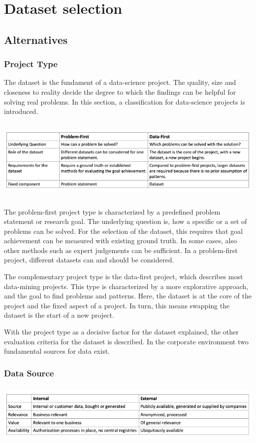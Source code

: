 \chapter{Dataset selection}

\section{Alternatives}

	\subsection{Project Type}
	The dataset is the fundament of a data-science project. The quality, size and closeness to reality decide the degree to which the findings can be helpful for solving real problems. 
	In this section, a classification for data-science projects is introduced.
	
	\includegraphics[height=4cm]{Bilder/meta_project.png}
	
	The problem-first project type is characterized by a predefined problem statement or research goal. The underlying question is, how a specific or a set of problems can be solved. For the selection of the dataset, this requires that goal achievement can be measured with existing ground truth. In some cases, also other methods such as expert judgements can be sufficient. In a problem-first project, different datasets can and should be considered.
	
	The complementary project type is the data-first project, which describes most data-mining projects. This type is characterized by a more explorative approach, and the goal to find problems and patterns. Here, the dataset is at the core of the project and the fixed aspect of a project. In turn, this means swapping the dataset is the start of a new project.
	
	With the project type as a decisive factor for the dataset explained, the other evaluation criteria for the dataset is described. In the corporate environment two fundamental sources for data exist. 
	
	\subsection{Data Source}
	\includegraphics[height=3cm]{Bilder/internal_external.png}
	
